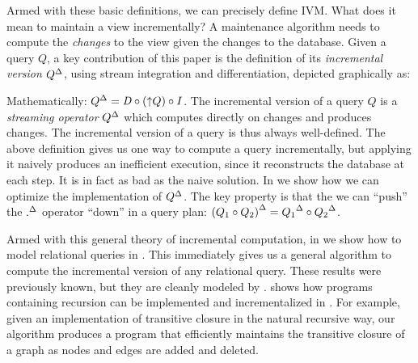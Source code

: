 Armed with these basic definitions, we can precisely define IVM.  What
does it mean to maintain a view incrementally?  A maintenance
algorithm needs to compute the \emph{changes} to the view given the
changes to the database. Given a query $Q$, a key contribution of this
paper is the definition of its \emph{incremental version} ${Q}^{\Delta}$,
using stream integration and differentiation, depicted graphically as:
\vspace{-2ex}
%
\begin{center}
\end{center}
\vspace{-1ex}
%
Mathematically: ${Q}^{\Delta} = \mathit{D} \circ ({\uparrow}Q) \circ \mathit{I}$.  The
incremental version of a query $Q$ is a \emph{streaming operator}
${Q}^{\Delta}$ which computes directly on changes and produces changes.
The incremental version of a query is thus always well-defined.  The
above definition gives us one way to compute a query incrementally,
but applying it naively produces an inefficient execution, since it
reconstructs the database at each step.  It is in fact as bad as the
naive solution.  In  we show how we can
optimize the implementation of ${Q}^{\Delta}$. The key property is that the
we can ``push'' the ${.}^{\Delta}$ operator ``down'' in a query plan:
${(Q_1 \circ Q_2)}^{\Delta} = {Q_1}^{\Delta} \circ {Q_2}^{\Delta}$.

Armed with this general theory of incremental computation, in
 we show how to model relational queries in
\dbsp.  This immediately gives us a general algorithm to compute the
incremental version of any relational query.  These results were
previously known, but they are cleanly modeled by \dbsp.
 shows how programs containing recursion can be
implemented and incrementalized in \dbsp.  For example, given an
implementation of transitive closure in the natural recursive way, our
algorithm produces a program that efficiently maintains the transitive
closure of a graph as nodes and edges are added and deleted.

